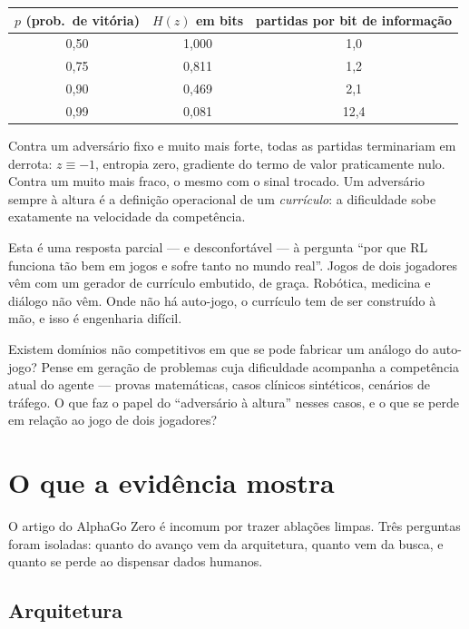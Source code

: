 \documentclass[11pt]{article}
\begin{document}
\begin{center}
\begin{tabular}{ccc}
\toprule
$p$ (prob.\ de vitória) & $H(z)$ em bits & partidas por bit de informação \\
\midrule
0,50 & 1,000 & 1,0 \\
0,75 & 0,811 & 1,2 \\
0,90 & 0,469 & 2,1 \\
0,99 & 0,081 & 12,4 \\
\bottomrule
\end{tabular}
\end{center}

Contra um adversário fixo e muito mais forte, todas as partidas terminariam em
derrota: $z \equiv -1$, entropia zero, gradiente do termo de valor praticamente
nulo. Contra um muito mais fraco, o mesmo com o sinal trocado. Um adversário
sempre à altura é a definição operacional de um \emph{currículo}: a dificuldade
sobe exatamente na velocidade da competência.

\begin{ideiabox}
Esta é uma resposta parcial — e desconfortável — à pergunta ``por que RL funciona
tão bem em jogos e sofre tanto no mundo real''. Jogos de dois jogadores vêm com um
gerador de currículo embutido, de graça. Robótica, medicina e diálogo não vêm.
Onde não há auto-jogo, o currículo tem de ser construído à mão, e isso é
engenharia difícil.
\end{ideiabox}

\begin{discbox}
Existem domínios não competitivos em que se pode fabricar um análogo do auto-jogo?
Pense em geração de problemas cuja dificuldade acompanha a competência atual do
agente — provas matemáticas, casos clínicos sintéticos, cenários de tráfego. O que
faz o papel do ``adversário à altura'' nesses casos, e o que se perde em relação
ao jogo de dois jogadores?
\end{discbox}

\section{O que a evidência mostra}

O artigo do AlphaGo Zero é incomum por trazer ablações limpas. Três perguntas
foram isoladas: quanto do avanço vem da arquitetura, quanto vem da busca, e quanto
se perde ao dispensar dados humanos.

\subsection{Arquitetura}
\end{document}
